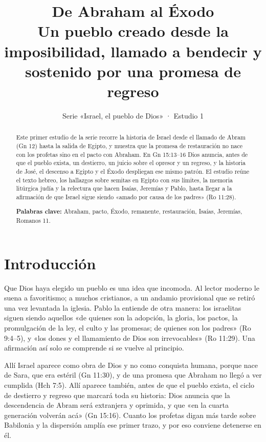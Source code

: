 \title{\color{ladrillo}\bfseries De Abraham al Éxodo\\[4pt]\large\color{cafe}\mdseries Un pueblo creado desde la imposibilidad, llamado a bendecir y sostenido por una promesa de regreso}
\author{}\date{\color{sepia}Serie «Israel, el pueblo de Dios» · Estudio 1}

\maketitle\thispagestyle{empty}

\begin{abstract}\noindent
Este primer estudio de la serie recorre la historia de Israel desde el llamado de Abram (Gn 12) hasta la salida de Egipto, y muestra que la promesa de restauración no nace con los profetas sino en el pacto con Abraham. En Gn 15:13–16 Dios anuncia, antes de que el pueblo exista, un destierro, un juicio sobre el opresor y un regreso, y la historia de José, el descenso a Egipto y el Éxodo despliegan ese mismo patrón. El estudio reúne el texto hebreo, los hallazgos sobre semitas en Egipto con sus límites, la memoria litúrgica judía y la relectura que hacen Isaías, Jeremías y Pablo, hasta llegar a la afirmación de que Israel sigue siendo «amado por causa de los padres» (Ro 11:28).
\par\smallskip\noindent\textbf{Palabras clave:} Abraham, pacto, Éxodo, remanente, restauración, Isaías, Jeremías, Romanos 11.
\end{abstract}

\section{Introducción}

Que Dios haya elegido un pueblo es una idea que incomoda. Al lector moderno le suena a favoritismo; a muchos cristianos, a un andamio provisional que se retiró una vez levantada la iglesia. Pablo la entiende de otra manera: los israelitas siguen siendo aquellos «de quienes son la adopción, la gloria, los pactos, la promulgación de la ley, el culto y las promesas; de quienes son los padres» (Ro 9:4–5), y «los dones y el llamamiento de Dios son irrevocables» (Ro 11:29). Una afirmación así solo se comprende si se vuelve al principio.

Allí Israel aparece como obra de Dios y no como conquista humana, porque nace de Sara, que era estéril (Gn 11:30), y de una promesa que Abraham no llegó a ver cumplida (Hch 7:5). Allí aparece también, antes de que el pueblo exista, el ciclo de destierro y regreso que marcará toda su historia: Dios anuncia que la descendencia de Abram será extranjera y oprimida, y que «en la cuarta generación volverán acá» (Gn 15:16). Cuanto los profetas digan más tarde sobre Babilonia y la dispersión amplía ese primer trazo, y por eso conviene detenerse en él.

